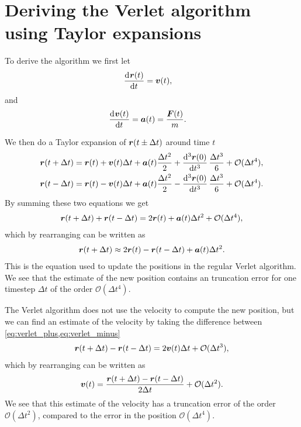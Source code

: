 \section{Deriving the Verlet algorithm using Taylor expansions}

To derive the algorithm we first let
\begin{align*}
    \dod{\rvec(t)}{t} &= \vvec(t),
\end{align*}
and
\begin{align*}
    \dod{\vvec(t)}{t} &= \avec(t) = \frac{\Fvec(t)}{m}.
\end{align*}

We then do a Taylor expansion of $\boldsymbol{r}(t \pm \Delta t)$ around time $t$
\begin{align}
    \rvec(t + \Delta t) &= \rvec(t) + \vvec(t)\Delta t + \avec(t)\frac{\Delta t^2}{2} + \dod[3]{\rvec(0)}{t}\frac{\Delta t^3}{6} + \mathcal{O}(\Delta t^4), \label{eq:verlet_plus}\\
    \rvec(t - \Delta t) &= \rvec(t) - \vvec(t)\Delta t + \avec(t)\frac{\Delta t^2}{2} - \dod[3]{\rvec(0)}{t}\frac{\Delta t^3}{6} + \mathcal{O}(\Delta t^4).\label{eq:verlet_minus}
\end{align}
By summing these two equations we get
\begin{align*}
    \boldsymbol{r}(t + \Delta t) + \boldsymbol{r}(t - \Delta t) = 2\boldsymbol{r}(t) + \boldsymbol{a}(t)\Delta t^2 + \mathcal{O}(\Delta t^4),
\end{align*}
which by rearranging can be written as
\begin{align*}
    \boldsymbol{r}(t + \Delta t) \approx 2\boldsymbol{r}(t) - \boldsymbol{r}(t - \Delta t) + \boldsymbol{a}(t)\Delta t^2.
\end{align*}
This is the equation used to update the positions in the regular Verlet algorithm. We see that the estimate of the new position contains an truncation error for one timestep $\Delta t$ of the order $\mathcal{O}(\Delta t^4)$.

The Verlet algorithm does not use the velocity to compute the new position, but we can find an estimate of the velocity by taking the difference between \cref{eq:verlet_plus,eq:verlet_minus}
\begin{align*}
    \boldsymbol{r}(t + \Delta t) - \boldsymbol{r}(t - \Delta t) = 2\boldsymbol{v}(t)\Delta t + \mathcal{O}(\Delta t^3),
\end{align*}
which by rearranging can be written as
\begin{align*}
    \boldsymbol{v}(t) = \frac{\boldsymbol{r}(t + \Delta t) - \boldsymbol{r}(t - \Delta t)}{2\Delta t} + \mathcal{O}(\Delta t^2).
\end{align*}
We see that this estimate of the velocity has a truncation error of the order $\mathcal{O}(\Delta t^2)$, compared to the error in the position $\mathcal{O}(\Delta t^4)$.


